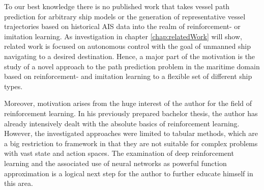 To our best knowledge there is no published work that takes vessel path prediction for arbitrary ship models or the generation of representative vessel trajectories based on historical AIS data into the realm of reinforcement- or imitation learning. As investigation in chapter \ref{chap:relatedWork} will show, related work is focused on autonomous control with the goal of unmanned ship navigating to a desired destination. Hence, a major part of the motivation is the study of a novel approach to the path prediction problem in the maritime domain based on reinforcement- and imitation learning to a flexible set of different ship types.
\par
Moreover, motivation arises from the huge interest of the author for the field of reinforcement learning. In his previously prepared bachelor thesis, the author has already intensively dealt with the absolute basics of reinforcement learning.  However, the investigated approaches were limited to tabular methods, which are a big restriction to framework in that they are not suitable for complex problems with vast state and action spaces. The examination of deep reinforcement learning and the associated use of neural networks as powerful function approximation is a logical next step for the author to further educate himself in this area.